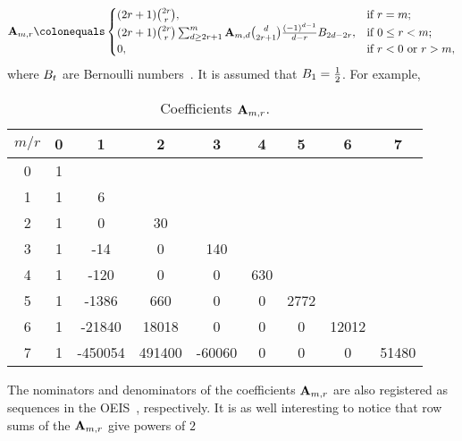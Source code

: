 \begin{equation}
    \label{eq:definition_coefficient_a}
    \coeffA{m}{r} \colonequals
    \begin{cases}
    (2r+1)
        \binom{2r}{r}, & \text{if } r=m; \\
        (2r+1) \binom{2r}{r} \sum_{d \geq 2r+1}^{m} \coeffA{m}{d} \binom{d}{2r+1} \frac{(-1)^{d-1}}{d-r}
        \bernoulli{2d-2r}, & \text{if } 0 \leq r<m; \\
        0, & \text{if } r<0 \text{ or } r>m,
    \end{cases}
\end{equation}
where ${B}\sb{t}$ are Bernoulli numbers~\cite{bateman1953higher}.
It is assumed that ${B}\sb{1}=\frac{1}{2}$.
For example,
\begin{table}[H]
    \begin{center}
        \setlength\extrarowheight{-6pt}
        \begin{tabular}{c|cccccccc}
            $m/r$ & 0 & 1       & 2      & 3      & 4   & 5    & 6     & 7 \\ [3px]
            \hline
            0     & 1 &         &        &        &     &      &       &       \\
            1     & 1 & 6       &        &        &     &      &       &       \\
            2     & 1 & 0       & 30     &        &     &      &       &       \\
            3     & 1 & -14     & 0      & 140    &     &      &       &       \\
            4     & 1 & -120    & 0      & 0      & 630 &      &       &       \\
            5     & 1 & -1386   & 660    & 0      & 0   & 2772 &       &       \\
            6     & 1 & -21840  & 18018  & 0      & 0   & 0    & 12012 &       \\
            7     & 1 & -450054 & 491400 & -60060 & 0   & 0    & 0     & 51480
        \end{tabular}
    \end{center}
    \caption{Coefficients ${\mathbf{A}} \sb{m,r}$.}
    \label{tab:table_of_coefficients_a}
\end{table}
The nominators and denominators of the coefficients ${\mathbf{A}} \sb{m,r}$ are also registered as sequences in
the OEIS~\cite{kolosov2018numerator,kolosov2018denominator}, respectively.
It is as well interesting to notice that row sums of the ${\mathbf{A}} \sb{m,r}$ give powers of $2$
